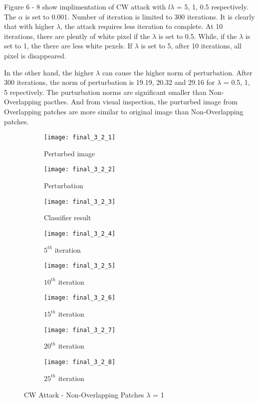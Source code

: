 \documentclass[11pt]{article}
\begin{document}
Figure 6 - 8 show implimentation of CW attack with $l\lambda$ = 5, 1, 0.5 respectively. The $\alpha$ is set to 0.001. Number of iteration is limited to 300 iterations. It is clearly that with higher $\lambda$, the attack requires less iteration to complete. At 10 iterations, there are plently of white pixel if the $\lambda$ is set to 0.5. While, if the $\lambda$ is set to 1, the there are less white pexels. If $\lambda$ is set to 5, after 10 iterations, all pixel is disappeared. 

In the other hand, the higher $\lambda$ can cause the higher norm of perturbation. After 300 iterations, the norm of perturbation is 19.19, 20.32 and 29.16 for $\lambda$ = 0.5, 1, 5 repectively. The purturbation norms are significant smaller than Non-Overlapping pacthes. And from visual inspection, the purturbed image from Overlapping patches are more similar to original image than Non-Overlapping patches.


\begin{figure}[H]
\begin{subfigure}{.22\textwidth}
  \centering
  \texttt{[image: final\_3\_2\_1]}
  \caption{Perturbed image}
  \label{fig:}
\end{subfigure}
\begin{subfigure}{.22\textwidth}
  \centering
  \texttt{[image: final\_3\_2\_2]}
  \caption{Perturbation}
  \label{fig:}
\end{subfigure}
\begin{subfigure}{.22\textwidth}
  \centering
  \texttt{[image: final\_3\_2\_3]}
  \caption{Classifier result}
  \label{fig:}
\end{subfigure}
\begin{subfigure}{.22\textwidth}
  \centering
  \texttt{[image: final\_3\_2\_4]}
  \caption{$5^{th}$ iteration}
  \label{fig:}
\end{subfigure}

\begin{subfigure}{.22\textwidth}
  \centering
  \texttt{[image: final\_3\_2\_5]}
  \caption{$10^{th}$ iteration}
  \label{fig:}
\end{subfigure}
\begin{subfigure}{.22\textwidth}
  \centering
  \texttt{[image: final\_3\_2\_6]}
  \caption{$15^{th}$ iteration}
  \label{fig:}
\end{subfigure}
\begin{subfigure}{.22\textwidth}
  \centering
  \texttt{[image: final\_3\_2\_7]}
  \caption{$20^{th}$ iteration}
  \label{fig:}
\end{subfigure}
\begin{subfigure}{.22\textwidth}
  \centering
  \texttt{[image: final\_3\_2\_8]}
  \caption{$25^{th}$ iteration}
  \label{fig:}
\end{subfigure}

\caption{CW Attack - Non-Overlapping Patches $\lambda$ = 1}
\label{fig:}
\end{figure}
\end{document}
